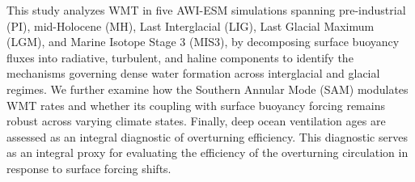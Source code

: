 \documentclass[draft]{agujournal2025}
\begin{document}





This study analyzes WMT in five AWI-ESM simulations spanning pre-industrial (PI), mid-Holocene (MH), Last Interglacial (LIG), Last Glacial Maximum (LGM), and Marine  Isotope Stage 3 (MIS3), by decomposing surface buoyancy fluxes into radiative, turbulent, and haline components to identify the mechanisms governing dense water formation across interglacial and glacial regimes. We further examine how the Southern Annular Mode (SAM) modulates WMT rates and whether its coupling with surface buoyancy forcing remains robust across varying climate states. Finally, deep ocean ventilation ages are assessed as an integral diagnostic of overturning efficiency. This diagnostic serves as  an integral proxy for evaluating the efficiency of the overturning circulation in response to surface forcing shifts.

\end{document}

